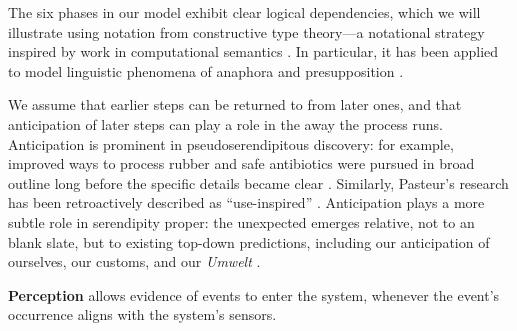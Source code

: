 
The six phases in our model exhibit clear logical dependencies, which
we will illustrate using notation from constructive type theory---a
notational strategy inspired by work in computational semantics
\cite{Chatzikyriakidis2018}.  In particular, it has been applied to
model linguistic phenomena of anaphora and presupposition
\cite{10.1007/978-3-662-43742-1_2,krahmer1999presupposition,piwek2000presuppositions}.

We assume that earlier steps can be returned to from later ones, and
that anticipation of later steps can play a role in the away the
process runs.  Anticipation is prominent in pseudoserendipitous
discovery: for example, improved ways to process rubber and safe
antibiotics were pursued in broad outline long before the specific
details became clear \cite{fleming,goodyear1855gum}.  Similarly,
Pasteur's research has been retroactively described as
``use-inspired'' \cite{stokes1997pasteur}.  Anticipation plays a more
subtle role in serendipity proper: the unexpected emerges relative,
not to an blank slate, but to existing top-down predictions, including
our anticipation of ourselves, our customs, and our \emph{Umwelt}
\cite{dennett_2013}.



\begin{defn}\label{def:perception}
\hypertarget{def:perception}{}\textbf{Perception} allows evidence of events to enter the system,
whenever the event's occurrence aligns with the system's sensors.
\end{defn}

